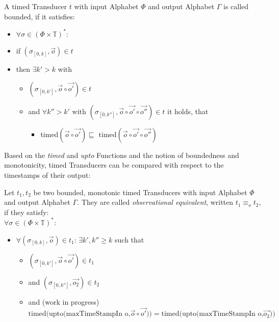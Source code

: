 \begin{definition}[name = Boundedness of Timed Transducers]\label{def:boundedness_timed_transducer}
  A timed Transducer \(t\) with input Alphabet \(\Phi\) and output Alphabet \(\Gamma\) is called bounded, if it satisfies:
  \begin{itemize}[label={}]
    \item \(\forall \sigma \in {(\Phi \times \mathbb{T})}^*\):
    \item if \((\sigma_{[0,k]}, \vec{o}) \in t\)
    \item then \(\exists k' > k\) with
      \begin{itemize}[label={}]
        \item \((\sigma_{[0,k']}, \vec{o} \circ \vec{o'}) \in t\)
        \item and \(\forall k'' > k' \text{ with } (\sigma_{[0,k'']}, \vec{o}\circ\vec{o'}\circ\vec{o''}) \in t \) it holds, that
          \begin{itemize}[label={}]
          \item timed\((\vec{o}\circ\vec{o'}) \sqsubseteq \text{ timed}(\vec{o}\circ\vec{o'}\circ\vec{o''})\)
          \end{itemize}
      \end{itemize}
  \end{itemize}
\end{definition}

Based on the \emph{timed} and \emph{upto} Functions and the notion of boundedness and monotonicity, timed Transducers can be compared with respect to the timestamps of their output:

\begin{definition}[name = Observational Equivalence]\label{def:observational_equivalence}
  Let \(t_1, t_2\) be two bounded, monotonic timed Transducers with input Alphabet \(\Phi\) and output Alphabet \(\Gamma\).
  They are called \emph{observational equivalent}, written \(t_1 \equiv_o t_2\), if they satisfy: \\
  \(\forall \sigma \in {(\Phi\times\mathbb{T})}^*\):
  \begin{itemize}[label={}]
    \item \(\forall (\sigma_{[0,k]}, \vec{o}) \in t_1\): \(\exists k', k'' \geq k\) such that
      \begin{itemize}[label={}]
        \item \((\sigma_{[0,k']}, \vec{o} \circ \vec{o'}) \in t_1\)
        \item and \((\sigma_{[0,k'']}, \vec{o_2}) \in t_2\)
        \item and (work in progress)\(\text{timed(upto(maxTimeStampIn o,}\vec{o} \circ \vec{o'} )) = \text{timed(upto(maxTimeStampIn o,}\vec{o_2}))\)
      \end{itemize}
  \end{itemize}
\end{definition}

